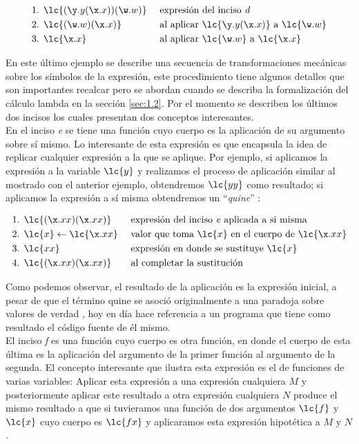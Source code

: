 \begin{align*} 
  \text{1. } &\lc{(\y.y(\x.x))(\w.w)} & &\text{ expresión del inciso \emph{d}}\\ 
  \text{2. } &\lc{(\w.w)(\x.x)} & &\text{ al aplicar } \lc{\y.y(\x.x)} \text{ a } \lc{\w.w}\\ 
  \text{3. } &\lc{\x.x} & &\text{ al aplicar } \lc{\w.w} \text{ a } \lc{\x.x}
\end{align*}

En este último ejemplo se describe una secuencia de transformaciones mecánicas
sobre los símbolos de la expresión, este procedimiento tiene algunos detalles
que son importantes recalcar pero se abordan cuando se describa la formalización
del cálculo lambda en la sección \ref{sec:1.2}. Por el momento se describen los
últimos dos incisos los cuales presentan dos conceptos interesantes.\\

En el inciso \emph{e} se tiene una función cuyo cuerpo es la aplicación de su
argumento sobre sí mismo. Lo interesante de esta expresión es que encapsula la
idea de replicar cualquier expresión a la que se aplique. Por ejemplo, si
aplicamos la expresión a la variable \(\lc{y}\) y realizamos el proceso de
aplicación similar al mostrado con el anterior ejemplo, obtendremos \(\lc{y y}\)
como resultado; si aplicamos la expresión a sí misma obtendremos un
``\emph{quine}'' \cite{Hofstadter:GEB}:

\begin{align*} 
  \text{1. } &\lc{(\x.x x)(\x.x x)} & &\text{ expresión del inciso \emph{e} aplicada a si misma}\\
  \text{2. } &\lc{x} \leftarrow \lc{\x.x x} & &\text{ valor que toma } \lc{x} \text{ en el cuerpo de } \lc{\x.x x}\\ 
  \text{3. } &\lc{x x} & &\text{ expresión en donde se sustituye } \lc{x}\\
  \text{4. } &\lc{(\x.x x)(\x.x x)} & &\text{ al completar la sustitución}
\end{align*}

Como podemos observar, el resultado de la aplicación es la expresión inicial, a
pesar de que el término quine se asoció originalmente a una paradoja sobre
valores de verdad \cite{Quine:Paradox}, hoy en día hace referencia a un programa
que tiene como resultado el código fuente de él mismo.\\

El inciso \emph{f} es una función cuyo cuerpo es otra función, en donde el
cuerpo de esta última es la aplicación del argumento de la primer función al
argumento de la segunda. El concepto interesante que ilustra esta expresión es
el de funciones de varias variables: Aplicar esta expresión a una expresión
cualquiera \(M\) y posteriormente aplicar este resultado a otra expresión
cualquiera \(N\) produce el mismo resultado a que si tuvieramos una función de
dos argumentos \(\lc{f}\) y \(\lc{x}\) cuyo cuerpo es \(\lc{f x}\) y aplicaramos
esta expresión hipotética a \(M\) y \(N\).\\

